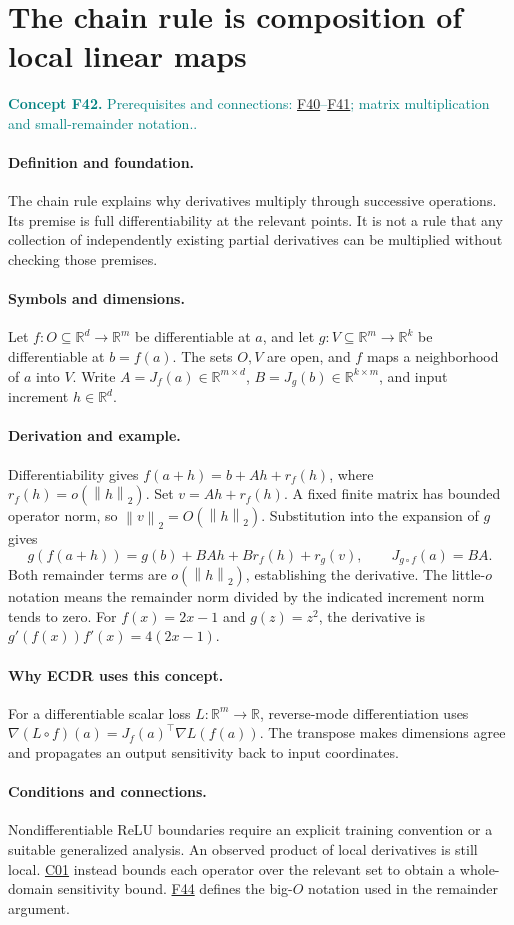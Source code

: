 \documentclass[11pt,a4paper]{article}
\newcommand{\R}{\mathbb R}
\newcommand{\norm}[1]{\left\lVert#1\right\rVert}
\newcommand{\conceptid}{Front matter}
\newcommand{\concept}[3]{\clearpage\renewcommand{\conceptid}{#1}%
\section{#2}\label{concept:#1}%
\textcolor{teal}{\textbf{Concept #1.} Prerequisites and connections: #3.}\par
\typeout{ECDR-CONCEPT-START #1 PAGE=\thepage}}
\begin{document}
\concept{F42}{The chain rule is composition of local linear maps}{\hyperref[concept:F40]{F40}--\hyperref[concept:F41]{F41}; matrix multiplication and small-remainder notation.}
\paragraph{Definition and foundation.}
The chain rule explains why derivatives multiply through successive operations. Its premise is full differentiability at the relevant points. It is not a rule that any collection of independently existing partial derivatives can be multiplied without checking those premises.
\paragraph{Symbols and dimensions.}
Let $f:O\subseteq\R^d\to\R^m$ be differentiable at $a$, and let $g:V\subseteq\R^m\to\R^k$ be differentiable at $b=f(a)$. The sets $O,V$ are open, and $f$ maps a neighborhood of $a$ into $V$. Write $A=J_f(a)\in\R^{m\times d}$, $B=J_g(b)\in\R^{k\times m}$, and input increment $h\in\R^d$.
\paragraph{Derivation and example.}
Differentiability gives $f(a+h)=b+Ah+r_f(h)$, where $r_f(h)=o(\norm h_2)$. Set $v=Ah+r_f(h)$. A fixed finite matrix has bounded operator norm, so $\norm v_2=O(\norm h_2)$. Substitution into the expansion of $g$ gives
\[
 g(f(a+h))=g(b)+BAh+B r_f(h)+r_g(v),
 \qquad J_{g\circ f}(a)=BA.
\]
Both remainder terms are $o(\norm h_2)$, establishing the derivative. The little-$o$ notation means the remainder norm divided by the indicated increment norm tends to zero. For $f(x)=2x-1$ and $g(z)=z^2$, the derivative is $g'(f(x))f'(x)=4(2x-1)$.
\paragraph{Why ECDR uses this concept.}
For a differentiable scalar loss $L:\R^m\to\R$, reverse-mode differentiation uses $\nabla(L\circ f)(a)=J_f(a)^\top\nabla L(f(a))$. The transpose makes dimensions agree and propagates an output sensitivity back to input coordinates.
\paragraph{Conditions and connections.}
Nondifferentiable ReLU boundaries require an explicit training convention or a suitable generalized analysis. An observed product of local derivatives is still local. \hyperref[concept:C01]{C01} instead bounds each operator over the relevant set to obtain a whole-domain sensitivity bound. \hyperref[concept:F44]{F44} defines the big-$O$ notation used in the remainder argument.
\par\label{endconcept:F42}
\end{document}
